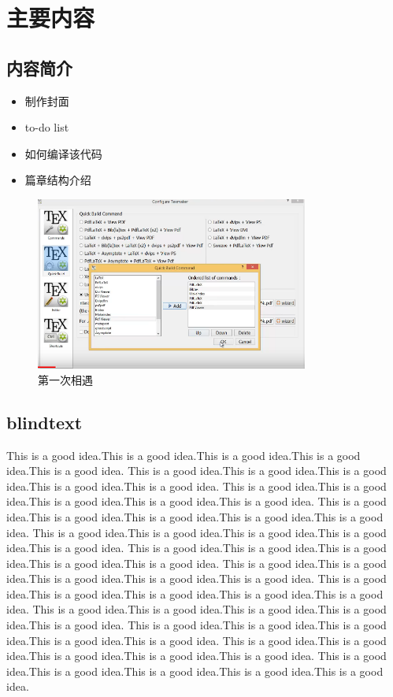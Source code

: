 
\chapter{主要内容}

\section{内容简介}

\begin{itemize}
	\item 制作封面
	\item to-do list
	\item 如何编译该代码
	\item 篇章结构介绍
\end{itemize}

\begin{figure}[!h]
	\includegraphics[width=0.8\textwidth]{figures/compiler_set.png}
	\caption{第一次相遇}
\end{figure}


\section{blindtext}

\blindtext %


This is a good idea.This is a good idea.This is a good idea.This is a good idea.This is a good idea.
This is a good idea.This is a good idea.This is a good idea.This is a good idea.This is a good idea.
This is a good idea.This is a good idea.This is a good idea.This is a good idea.This is a good idea.
This is a good idea.This is a good idea.This is a good idea.This is a good idea.This is a good idea.
This is a good idea.This is a good idea.This is a good idea.This is a good idea.This is a good idea.
This is a good idea.This is a good idea.This is a good idea.This is a good idea.This is a good idea.
This is a good idea.This is a good idea.This is a good idea.This is a good idea.This is a good idea.
This is a good idea.This is a good idea.This is a good idea.This is a good idea.This is a good idea.
This is a good idea.This is a good idea.This is a good idea.This is a good idea.This is a good idea.
This is a good idea.This is a good idea.This is a good idea.This is a good idea.This is a good idea.
This is a good idea.This is a good idea.This is a good idea.This is a good idea.This is a good idea.
This is a good idea.This is a good idea.This is a good idea.This is a good idea.This is a good idea.